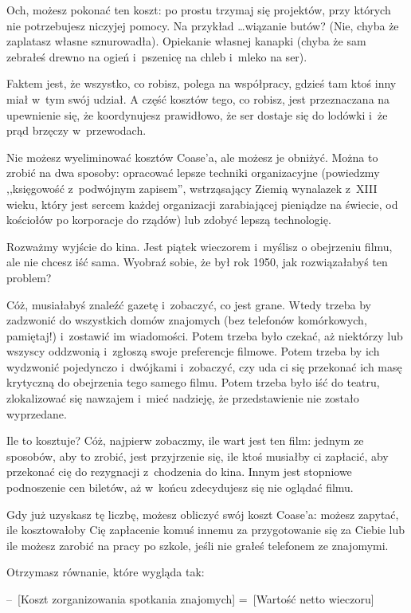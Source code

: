 \documentclass[oneside,polish,11pt,rmheadings]{mwbk}
\begin{document}
Och, możesz pokonać ten koszt: po prostu trzymaj się projektów, przy których nie potrzebujesz niczyjej pomocy. Na przykład \ldots  wiązanie butów? (Nie, chyba że zaplatasz własne sznurowadła). Opiekanie własnej kanapki (chyba że sam zebrałeś drewno na ogień i~pszenicę na chleb i~mleko na ser).

Faktem jest, że wszystko, co robisz, polega na współpracy, gdzieś tam ktoś inny miał w~tym swój udział. A część kosztów tego, co robisz, jest przeznaczana na upewnienie się, że koordynujesz prawidłowo, że ser dostaje się do lodówki i~że prąd brzęczy w~przewodach.

Nie możesz wyeliminować kosztów Coase'a, ale możesz je obniżyć. Można to zrobić na dwa sposoby: opracować lepsze techniki organizacyjne (powiedzmy ,,księgowość z~podwójnym zapisem'', wstrząsający Ziemią wynalazek z~XIII wieku, który jest sercem każdej organizacji zarabiającej pieniądze na świecie, od kościołów po korporacje do rządów) lub zdobyć lepszą technologię.

Rozważmy wyjście do kina. Jest piątek wieczorem i~myślisz o obejrzeniu filmu, ale nie chcesz iść sama. Wyobraź sobie, że był rok 1950, jak rozwiązałabyś ten problem?

Cóż, musiałabyś znaleźć gazetę i~zobaczyć, co jest grane. Wtedy trzeba by zadzwonić do wszystkich domów znajomych (bez telefonów komórkowych, pamiętaj!) i~zostawić im wiadomości. Potem trzeba było czekać, aż niektórzy lub wszyscy oddzwonią i~zgłoszą swoje preferencje filmowe. Potem trzeba by ich wydzwonić pojedynczo i~dwójkami i~zobaczyć, czy uda ci się przekonać ich masę krytyczną do obejrzenia tego samego filmu. Potem trzeba było iść do teatru, zlokalizować się nawzajem i~mieć nadzieję, że przedstawienie nie zostało wyprzedane.

Ile to kosztuje? Cóż, najpierw zobaczmy, ile wart jest ten film: jednym ze sposobów, aby to zrobić, jest przyjrzenie się, ile ktoś musiałby ci zapłacić, aby przekonać cię do rezygnacji z~chodzenia do kina. Innym jest stopniowe podnoszenie cen biletów, aż w~końcu zdecydujesz się nie oglądać filmu.

Gdy już uzyskasz tę liczbę, możesz obliczyć swój koszt Coase'a: możesz zapytać, ile kosztowałoby Cię zapłacenie komuś innemu za przygotowanie się za Ciebie lub ile możesz zarobić na pracy po szkole, jeśli nie grałeś telefonem ze znajomymi.

Otrzymasz równanie, które wygląda tak:

 --~[Koszt zorganizowania spotkania znajomych] =~[Wartość netto wieczoru]
\end{document}
